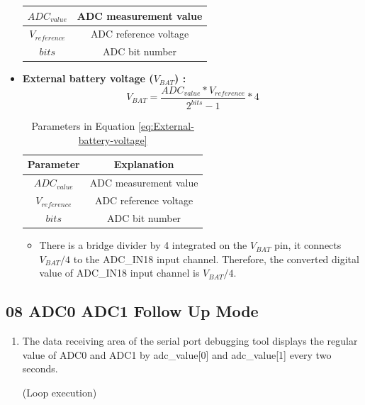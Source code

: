 \documentclass[12pt,a4paper]{ctexart}
\begin{document}
\begin{itemize}
\begin{table}[htbp]
\begin{tabular}{|c|c|}
                  \hline
                  $ADC_{value}$   & ADC measurement value \\
                  \hline
                  $V_{reference}$ & ADC reference voltage \\
                  \hline
                  $bits$          & ADC bit number        \\
                  \hline
              \end{tabular}
          \end{table}
    \item \textbf{External battery voltage ($V_{BAT}$) :}
          \begin{equation}
              V_{BAT}=\frac{ADC_{value}*V_{reference}}{2^{bits}-1}*4
              \label{eq:External-battery-voltage}
          \end{equation}
          \begin{table}[htbp]
              \centering
              \caption{Parameters in Equation \eqref{eq:External-battery-voltage}}
              \begin{tabular}{|c|c|}
                  \hline
                  Parameter       & Explanation           \\
                  \hline
                  $ADC_{value}$   & ADC measurement value \\
                  \hline
                  $V_{reference}$ & ADC reference voltage \\
                  \hline
                  $bits$          & ADC bit number        \\
                  \hline
              \end{tabular}
          \end{table}
          \begin{itemize}
              \item There is a bridge divider by 4 integrated on the $V_{BAT}$ pin, it connects $V_{BAT}/4$ to the ADC\_IN18 input channel. Therefore, the converted digital value of ADC\_IN18 input channel is $V_{BAT}/4$.
          \end{itemize}
\end{itemize}

\subsection{08 ADC0 ADC1 Follow Up Mode}

\begin{enumerate}
    \item The data receiving area of the serial port debugging tool displays the regular value of ADC0 and ADC1 by adc\_value[0] and adc\_value[1] every two seconds.
          
          (Loop execution)
\end{enumerate}
\end{document}
